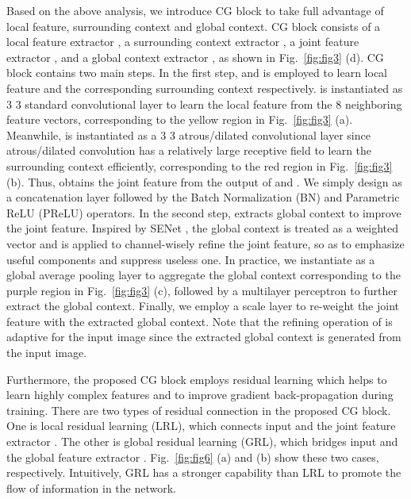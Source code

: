\documentclass[10pt,twocolumn,letterpaper]{article}
\begin{document}
Based on the above analysis, we introduce CG block to take full advantage of local feature, surrounding context and global context. CG block consists of  a local feature extractor , a surrounding context extractor  , a joint feature extractor , and a global context extractor , as shown in Fig.~\ref{fig:fig3} (d).
CG block contains two main steps.
In the first step,   and  is employed to learn local feature and the corresponding surrounding context respectively.
 is instantiated as 3  3 standard convolutional layer to learn the local feature from the 8 neighboring feature vectors, corresponding to the yellow region in Fig.~\ref{fig:fig3} (a).
Meanwhile,  is instantiated as a 3  3 atrous/dilated convolutional layer since atrous/dilated convolution has a relatively large receptive field to learn the surrounding context efficiently, corresponding to the red region in Fig.~\ref{fig:fig3} (b).
Thus,  obtains the joint feature from the output of  and . We simply design  as a concatenation layer followed by the Batch Normalization (BN) and Parametric ReLU (PReLU) operators.
In the second step,  extracts global context to improve the joint feature. Inspired by SENet \cite{hu2017squeeze}, the global context is treated as a weighted vector and is applied to channel-wisely refine the joint feature, so as to emphasize useful components and suppress useless one.
In practice, we instantiate  as a global average pooling layer to aggregate the global context corresponding to the purple region in Fig.~\ref{fig:fig3} (c), followed by a multilayer perceptron to further extract the global context. Finally, we employ a scale layer to re-weight the joint feature with the extracted global context. Note that the refining operation of  is adaptive for the input image since the extracted global context is generated from the input image.






Furthermore, the proposed CG block employs residual learning \cite{he2016deep} which helps to learn highly complex features and to improve gradient back-propagation during training. There are two types of residual connection in the proposed CG block. One is local residual learning (LRL), which connects input and the joint feature extractor . The other is global residual learning (GRL),  which bridges input and the global feature extractor . Fig.~\ref{fig:fig6} (a) and (b) show these two cases, respectively. Intuitively, GRL has a stronger capability than LRL to promote the flow of information in the network.
\end{document}
